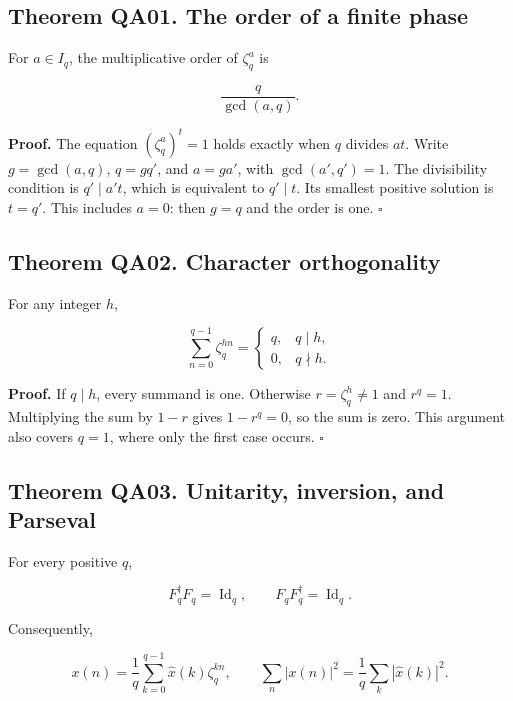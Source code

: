 \hypertarget{q:theorem-qa01.-the-order-of-a-finite-phase}{%
\subsection*{Theorem QA01. The order of a finite
phase}\label{q:theorem-qa01.-the-order-of-a-finite-phase}}

For \(a\in I_q\), the multiplicative order of \(\zeta_q^a\) is

\[
\frac q{\gcd(a,q)}.
\]

\textbf{Proof.} The equation \((\zeta_q^a)^t=1\) holds exactly when
\(q\) divides \(at\). Write \(g=\gcd(a,q)\), \(q=gq'\), and \(a=ga'\),
with \(\gcd(a',q')=1\). The divisibility condition is \(q'\mid a't\),
which is equivalent to \(q'\mid t\). Its smallest positive solution is
\(t=q'\). This includes \(a=0\): then \(g=q\) and the order is one.
\(\square\)

\hypertarget{q:theorem-qa02.-character-orthogonality}{%
\subsection*{Theorem QA02. Character
orthogonality}\label{q:theorem-qa02.-character-orthogonality}}

For any integer \(h\),

\[
\sum_{n=0}^{q-1}\zeta_q^{hn}
=\begin{cases}q,&q\mid h,\\0,&q\nmid h.\end{cases}
\]

\textbf{Proof.} If \(q\mid h\), every summand is one. Otherwise
\(r=\zeta_q^h\ne1\) and \(r^q=1\). Multiplying the sum by \(1-r\) gives
\(1-r^q=0\), so the sum is zero. This argument also covers \(q=1\),
where only the first case occurs. \(\square\)

\hypertarget{q:theorem-qa03.-unitarity-inversion-and-parseval}{%
\subsection*{Theorem QA03. Unitarity, inversion, and
Parseval}\label{q:theorem-qa03.-unitarity-inversion-and-parseval}}

For every positive \(q\),

\[
F_q^\dagger F_q=\operatorname{Id}_q,
\qquad F_qF_q^\dagger=\operatorname{Id}_q.
\]

Consequently,

\[
x(n)=\frac1q\sum_{k=0}^{q-1}\widehat{x}(k)\zeta_q^{kn},
\qquad
\sum_n|x(n)|^2=\frac1q\sum_k|\widehat{x}(k)|^2.
\]

